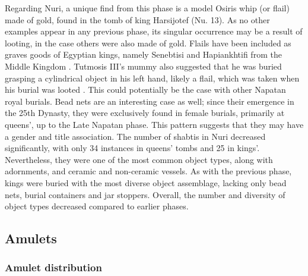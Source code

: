  
 Regarding Nuri, a unique find from this phase is a model Osiris whip (or flail) made of gold, found in the tomb of king Harsijotef (Nu. 13). As no other examples appear in any previous phase, its singular occurrence may be a result of looting, in the case others were also made of gold. Flails have been included as graves goods of Egyptian kings, namely Senebtisi and Hapiankhtifi from the Middle Kingdom \parencites[p.~78, figs.~35, 9]{maceTombSenebtisiLisht1916}[p.~244, cat.~181]{quirkeUnderstandingDeathJourney2015}. Tutmosis III's mummy also suggested that he was buried grasping a cylindrical object in his left hand, likely a flail, which was taken when his burial was looted \parencites[p.~5]{smithRoyalMummiesCG1912}. This could potentially be the case with other Napatan royal burials. Bead nets are an interesting case as well; since their emergence in the 25th Dynasty, they were exclusively found in female burials, primarily at queens', up to the Late Napatan phase. This pattern suggests that they may have a gender and title association. The number of shabtis in Nuri decreased significantly, with only 34 instances in queens' tombs and 25 in kings'. Nevertheless, they were one of the most common object types, along with adornments, and ceramic and non-ceramic vessels. As with the previous phase, kings were buried with the most diverse object assemblage, lacking only bead nets, burial containers and jar stoppers. Overall, the number and diversity of object types decreased compared to earlier phases.


\subsection{Amulets}
 

\subsubsection{Amulet distribution}
 
